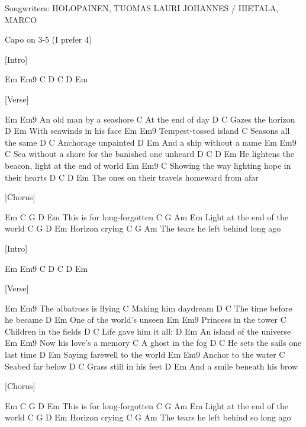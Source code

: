Songwriters: HOLOPAINEN, TUOMAS LAURI JOHANNES / HIETALA, MARCO


Capo on 3-5 (I prefer 4)


[Intro]

 Em Em9 C D C D Em


[Verse]

Em                     Em9
An old man by a seashore
 C
 At the end of day
 D          C
 Gazes the horizon
 D                     Em
 With seawinds in his face
 Em                Em9
 Tempest-tossed island
 C
 Seasons all the same
 D          C
 Anchorage unpainted
 D                   Em
 And a ship without a name
 Em              Em9         C
 Sea without a shore for the banished one unheard
 D                C                   D       Em
 He lightens the beacon, light at the end of world
 Em          Em9  C
 Showing the way lighting hope in their hearts
 D                   C              D     Em
 The ones on their travels homeward from afar


[Chorus]

 Em           C    G D Em
 This is for long-forgotten
 C            G          Am Em
 Light at the end of the world
 C   G    D  Em
 Horizon crying
 C                  G        Am
 The tears he left behind long ago


[Intro]

 Em Em9 C D C D Em


[Verse]

  Em                Em9
 The albatross is flying
 C
 Making him daydream
  D                C
 The time before he became
  D                Em
 One of the world's unseen
 Em               Em9
 Princess in the tower
  C
 Children in the fields
 D          C
 Life gave him it all:
 D                Em
 An island of the universe
 Em                   Em9
 Now his love's a memory
  C
 A ghost in the fog
 D                 C
 He sets the sails one last time
  D                    Em
 Saying farewell to the world
  Em            Em9
 Anchor to the water
 C
 Seabed far below
  D            C
 Grass still in his feet
  D                    Em
 And a smile beneath his brow


[Chorus]

 Em           C   G  D Em
 This is for long-forgotten
 C             G         Am Em
 Light at the end of the world
 C   G   D  Em
 Horizon crying
 C                  G         Am
 The tears he left behind so long ago
